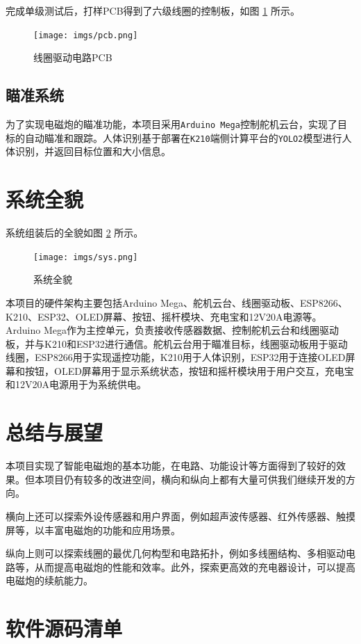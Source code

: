 \documentclass{article}
\begin{document}
完成单级测试后，打样PCB得到了六级线圈的控制板，如图 \ref{coilpcb} 所示。

\begin{figure}
    \centering
    \texttt{[image: imgs/pcb.png]}
    \caption{线圈驱动电路PCB}
    \label{coilpcb}
\end{figure}
\subsection{瞄准系统}
为了实现电磁炮的瞄准功能，本项目采用\texttt{Arduino Mega}控制舵机云台，实现了目标的自动瞄准和跟踪。人体识别基于部署在\texttt{K210}端侧计算平台的\texttt{YOLO2}模型进行人体识别，并返回目标位置和大小信息。

\section{系统全貌}
系统组装后的全貌如图 \ref{system} 所示。
\begin{figure}
    \centering
    \texttt{[image: imgs/sys.png]}
    \caption{系统全貌}
    \label{system}
\end{figure}
本项目的硬件架构主要包括Arduino Mega、舵机云台、线圈驱动板、ESP8266、K210、ESP32、OLED屏幕、按钮、摇杆模块、充电宝和12V20A电源等。Arduino Mega作为主控单元，负责接收传感器数据、控制舵机云台和线圈驱动板，并与K210和ESP32进行通信。舵机云台用于瞄准目标，线圈驱动板用于驱动线圈，ESP8266用于实现遥控功能，K210用于人体识别，ESP32用于连接OLED屏幕和按钮，OLED屏幕用于显示系统状态，按钮和摇杆模块用于用户交互，充电宝和12V20A电源用于为系统供电。
\section{总结与展望}
本项目实现了智能电磁炮的基本功能，在电路、功能设计等方面得到了较好的效果。但本项目仍有较多的改进空间，横向和纵向上都有大量可供我们继续开发的方向。

横向上还可以探索外设传感器和用户界面，例如超声波传感器、红外传感器、触摸屏等，以丰富电磁炮的功能和应用场景。

纵向上则可以探索线圈的最优几何构型和电路拓扑，例如多线圈结构、多相驱动电路等，从而提高电磁炮的性能和效率。此外，探索更高效的充电器设计，可以提高电磁炮的续航能力。
\appendix
\section{软件源码清单}
\end{document}
